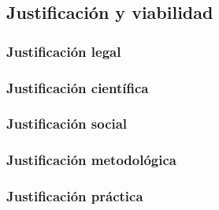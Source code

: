 \documentclass[12pt,a4paper]{article}
\begin{document}
\subsection{Justificación y viabilidad}

\subsubsection{Justificación legal}

\subsubsection{Justificación científica}

\subsubsection{Justificación social}

\subsubsection{Justificación metodológica}

\subsubsection{Justificación práctica}


\end{document}
